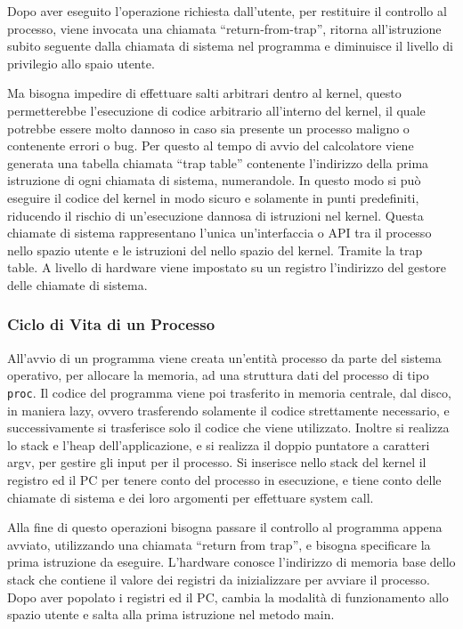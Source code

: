 \documentclass{article}
\numberwithin{equation}{subsection}
\begin{document}
Dopo aver eseguito l'operazione richiesta dall'utente, per restituire il controllo al processo, viene invocata una chiamata ``return-from-trap'', ritorna all'istruzione 
subito seguente dalla chiamata di sistema nel programma e diminuisce il livello di privilegio allo spaio utente. 

Ma bisogna impedire di effettuare salti arbitrari dentro al kernel, questo permetterebbe l'esecuzione di codice arbitrario all'interno del kernel, il quale potrebbe 
essere molto dannoso in caso sia presente un processo maligno o contenente errori o bug. Per questo al tempo di avvio del calcolatore viene generata una tabella 
chiamata ``trap table'' contenente l'indirizzo della prima istruzione di ogni chiamata di sistema, numerandole. 
In questo modo si può eseguire il codice del kernel in modo sicuro e solamente in punti predefiniti, riducendo il rischio di un'esecuzione dannosa di istruzioni nel 
kernel. 
Questa chiamate di sistema rappresentano l'unica un'interfaccia o API tra il processo nello spazio utente e le istruzioni del nello spazio del kernel. Tramite la 
trap table. 
A livello di hardware viene impostato su un registro l'indirizzo del gestore delle chiamate di sistema. 

\subsubsection{Ciclo di Vita di un Processo}

All'avvio di un programma viene creata un'entità processo da parte del sistema operativo, per allocare la memoria, ad una struttura dati del processo di tipo \verb|proc|. 
Il codice del programma viene poi trasferito in memoria centrale, dal disco, in maniera lazy, ovvero trasferendo solamente il codice strettamente 
necessario, e successivamente si trasferisce solo il codice che viene utilizzato. 
Inoltre si realizza lo stack e l'heap dell'applicazione, e si realizza il doppio puntatore a caratteri argv, per gestire gli input per il processo. Si inserisce nello 
stack del kernel il registro ed il PC per tenere conto del processo in esecuzione, e tiene conto delle chiamate di sistema e dei loro argomenti per effettuare system call. 

Alla fine di questo operazioni bisogna passare il controllo al programma appena avviato, utilizzando una chiamata ``return from trap'', e bisogna specificare la prima 
istruzione da eseguire. L'hardware conosce l'indirizzo di memoria base dello stack che contiene il valore dei registri da inizializzare per avviare il processo. Dopo 
aver popolato i registri ed il PC, cambia la modalità di funzionamento allo spazio utente e salta alla prima istruzione nel metodo main. 
\end{document}
